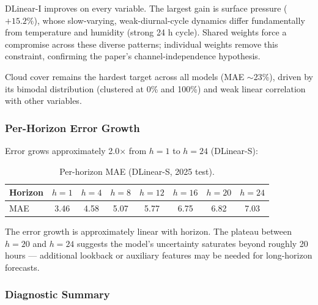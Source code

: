 DLinear-I improves on every variable. The largest gain is surface pressure
($+15.2\%$), whose slow-varying, weak-diurnal-cycle dynamics differ fundamentally
from temperature and humidity (strong 24 h cycle). Shared weights force a
compromise across these diverse patterns; individual weights remove this
constraint, confirming the paper's channel-independence hypothesis.

Cloud cover remains the hardest target across all models (MAE $\sim$23\%), driven
by its bimodal distribution (clustered at 0\% and 100\%) and weak linear
correlation with other variables.

\subsubsection{Per-Horizon Error Growth}

Error grows approximately 2.0$\times$ from $h=1$ to $h=24$ (DLinear-S):

\begin{table}[H]
\centering
\caption{Per-horizon MAE (DLinear-S, 2025 test).}
\begin{tabular}{lccccccc}
\toprule
Horizon & $h=1$ & $h=4$ & $h=8$ & $h=12$ & $h=16$ & $h=20$ & $h=24$ \\
\midrule
MAE & 3.46 & 4.58 & 5.07 & 5.77 & 6.75 & 6.82 & 7.03 \\
\bottomrule
\end{tabular}
\end{table}

The error growth is approximately linear with horizon. The plateau between
$h=20$ and $h=24$ suggests the model's uncertainty saturates beyond roughly
20 hours --- additional lookback or auxiliary features may be needed for
long-horizon forecasts.

\subsubsection{Diagnostic Summary}

